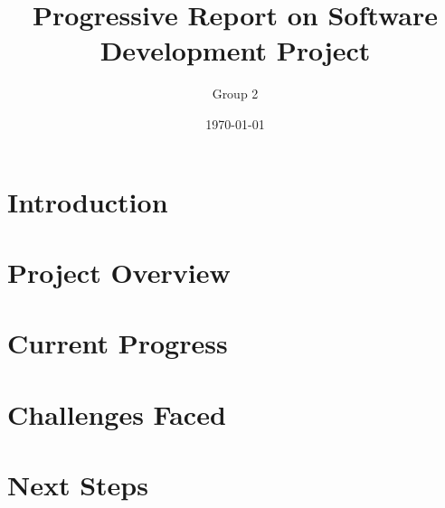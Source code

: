 \documentclass{article}
\title{Progressive Report on Software Development Project }
\author{Group 2}
\date{\today}
\begin{document}
\maketitle

\section{Introduction}

\section{Project Overview}

\section{Current Progress}

\section{Challenges Faced}

\section{Next Steps}
\end{document}

